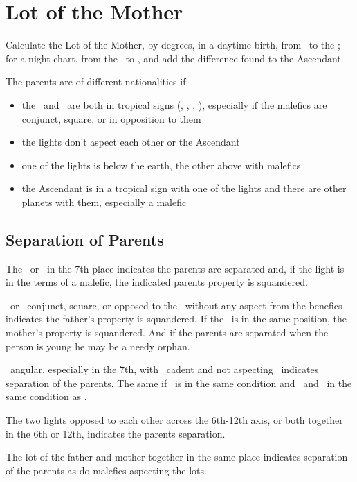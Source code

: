 \section{Lot of the Mother}

Calculate the Lot of the Mother, by degrees, in a daytime birth, from \Venus\, to the \Moon; for a night chart, from the \Moon\, to \Venus, and add the difference found to the Ascendant.

The parents are of different nationalities if:
\begin{itemize}[topsep=0em, itemsep=0em]
\item the \Sun\, and \Moon\, are both in tropical signs (\Aries, \Cancer, \Libra, \Capricorn), especially if the malefics are conjunct, square, or in opposition to them

\item the lights don't aspect each other or the Ascendant

\item one of the lights is below the earth, the other above with malefics

\item the Ascendant is in a tropical sign with one of the lights and there are other planets with them, especially a malefic
\end{itemize}

\subsection{Separation of Parents}
The \Sun\, or \Moon\, in the 7th place indicates the parents are separated and, if the light is in the terms of a malefic, the indicated parents property is squandered.

\Mars\, or \Saturn\, conjunct, square, or opposed to the \Sun\, without any aspect from the benefics indicates the father's property is squandered. If the \Moon\, is in the same position, the mother's property is squandered. And if the parents are separated when the person is young he may be a needy orphan.

\Saturn\, angular, especially in the 7th,  with \Jupiter\, cadent and not aspecting \Saturn\, indicates separation of the parents. The same if \Mars\, is in the same condition and \Saturn\, and \Venus\, in the same condition as \Jupiter.

The two lights opposed to each other across the 6th-12th axis, or both together in the 6th or 12th, indicates the parents separation.

The lot of the father and mother together in the same place indicates separation of the parents as do malefics aspecting the lots.

